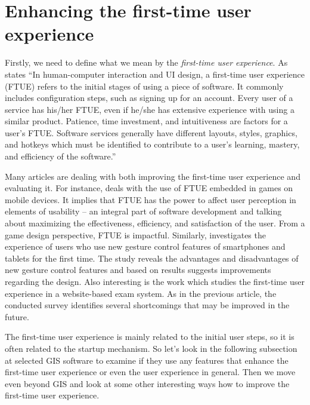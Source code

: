 \documentclass[a4paper,10pt,twoside]{article}
\begin{document}
\newpage
\vspace*{-1cm}
\section{Enhancing the first-time user experience}
\label{subsection:enhancing}

Firstly, we need to define what we mean by the \textit{first-time user experience}. As \cite{ftue} states ``In human-computer interaction and UI design, a first-time user experience (FTUE) refers to the initial stages of using a piece of software. It commonly includes configuration steps, such as signing up for an account. Every user of a service has his/her FTUE, even if he/she has extensive experience with using a similar product. Patience, time investment, and intuitiveness are factors for a user's FTUE. Software services generally have different layouts, styles, graphics, and hotkeys which must be identified to contribute to a user's learning, mastery, and efficiency of the software.''

Many articles are dealing with both improving the first-time user experience and evaluating it. For instance, \cite{BARNETT201882} deals with the use of FTUE embedded in games on mobile devices. It implies that FTUE has the power to affect user perception in elements of usability -- an integral part of software development and talking about maximizing the effectiveness, efficiency, and satisfaction of the user. From a game design perspective, FTUE is impactful. Similarly, \cite{smartphones} investigates the experience of users who use new gesture control features of smartphones and tablets for the first time. The study reveals the advantages and disadvantages of new gesture control features and based on results suggests improvements regarding the design. Also interesting is the work \cite{onlineexamination} which studies the first-time user experience in a website-based exam system. As in the previous article, the conducted survey identifies several shortcomings that may be improved in the future.

The first-time user experience is mainly related to the initial user steps, so it is often related to the startup mechanism. So let's look in the following subsection at selected GIS software to examine if they use any features that enhance the first-time user experience or even the user experience in general. Then we move even beyond GIS and look at some other interesting ways how to improve the first-time user experience.
\end{document}

